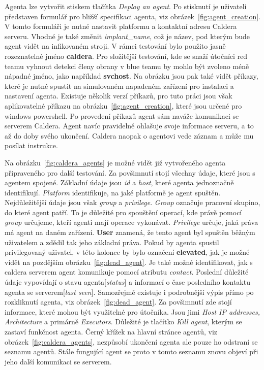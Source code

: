 Agenta lze vytvořit stiskem tlačítka \textit{Deploy an agent}.
Po stisknutí je uživateli představen formulář pro bližší specifikaci agenta, viz obrázek~\ref{fig:agent_creation}.
V tomto formuláři je nutné nastavit platformu a kontaktní adresu Caldera serveru.
Vhodné je také změnit \textit{implant\_name}, což je název, pod kterým bude agent vidět na infikovaném stroji.
V rámci testování bylo použito jasně rozeznatelné jméno \textbf{caldera}.
Pro složitější testování, kde se snaží útočníci red teamu vyhnout detekci členy obrany v blue teamu by mohlo být zvoleno méně nápadné jméno, jako například \textbf{svchost}.
Na obrázku jsou pak také vidět příkazy, které je nutné spustit na simulovaném napadeném zařízení pro instalaci a nastavení agenta.
Existuje několik verzí příkazů, pro tuto práci jsou však aplikovatelné příkazu na obrázku~\ref{fig:agent_creation}, které jsou určené pro windows powershell.
Po provedení příkazů agent sám naváže komunikaci se serverem Caldera.
Agent navíc pravidelně ohlašuje svoje informace serveru, a to až do doby svého ukončení.
Caldera naopak o agentovi vede záznam a může mu posílat instrukce.


Na obrázku~\ref{fig:caldera_agents} je možné vidět již vytvořeného agenta připraveného pro další testování.
Za povšimnutí stojí všechny údaje, které jsou s agentem spojené.
Základní údaje jsou \textit{id} a \textit{host}, které agenta jednoznačně identifikují.
\textit{Platform} identifikuje, na jaké platformě je agent spuštěn.
Nejdůležitější údaje jsou však \textit{group} a \textit{privilege}.
\textit{Group} označuje pracovní skupino, do které agent patří.
To je důležité pro spouštění operací, kde právě pomocí \textit{group} určujeme, kteří agenti mají operace vykonávat.
\textit{Privilege} určuje, jaká práva má agent na daném zařízení.
\textbf{User} znamená, že tento agent byl spuštěn běžným uživatelem a zdědil tak jeho základní práva.
Pokud by agenta spustil privilegovaný uživatel, v této kolonce by bylo označení \textbf{elevated}, jak je možné vidět na pozdějším obrázku~\ref{fig:dead_agent}.
Je také možné identifikovat, jak s caldera serverem agent komunikuje pomocí atributu \textit{contact}.
Poslední důležité údaje vypovídají o stavu agenta[\textit{status}] a informací o čase posledního kontaktu agenta se serverem[\textit{last seen}].
Samozřejmě existuje i podrobnější výpis přímo po rozkliknutí agenta, viz obrázek~\ref{fig:dead_agent}.
Za povšimnutí zde stojí informace, které mohou být využitelné pro útočníka.
Jsou jimi \textit{Host IP addresses, Architecture} a primárně \textit{Executors}.
Důležité je tlačítko \textit{Kill agent}, kterým se zastaví funkčnost agenta.
Černý křížek na hlavní stránce agentů, viz obrázek~\ref{fig:caldera_agents}, nezpůsobí ukončení agenta ale pouze ho odstraní se seznamu agentů.
Stále fungující agent se proto v tomto seznamu znovu objeví při jeho další komunikaci se serverem.


